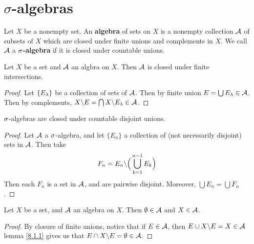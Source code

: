 \section{$\sigma$-algebras}

\begin{definition}
    Let $X$ be a nonempty set. An  \textbf{algebra} of sets on $X$ is a nonempty
    collection  $\mathcal{A}$ of subsets of $X$ which are closed under finite unions and
    complements in $X$. We call  $\mathcal{A}$ a \textbf{$\sigma$-algebra} if it is closed
    under countable unions.
\end{definition}

\begin{lemma}\label{8.1.1}
    Let $X$ be a set and $\mathcal{A}$ an algbra on $X$. Then $\mathcal{A}$ is closed under
    finite intersections.
\end{lemma}
\begin{proof}
    Let $\{E_\lambda\}$ be a collection of sets of $\mathcal{A}$. Then by finite union
    $E=\bigcup{E_\lambda} \in \mathcal{A}$. Then by complements,
    $X \backslash E=\bigcap{X \backslash E_\lambda} \in \mathcal{A}$.
\end{proof}
\begin{corollary}
    $\sigma$-algebras are closed under countable disjoint unions.
\end{corollary}
\begin{proof}
    Let $\mathcal{A}$ a $\sigma$-algebra, and let  $\{E_n\}$ a collection of (not
    necessarily disjoint) sets in $\mathcal{A}$. Then take
    \begin{equation}
        F_n=E_n \backslash \Big{(} \bigcup_{k=1}^{n-1}{E_k} \Big{)}
    \end{equation}
    Then each $F_n$ is a set in $\mathcal{A}$, and are pairwise disjoint. Moreover,
    $\bigcup{E_n}=\bigcup{F_n}$.
\end{proof}

\begin{lemma}\label{8.1.2}
    Let $X$ be a set, and $\mathcal{A}$ an algebra on $X$. Then $\emptyset \in \mathcal{A}$ and
    $X \in \mathcal{A}$.
\end{lemma}
\begin{proof}
    By closure of finite unions, notice that if $E \in \mathcal{A}$, then
    $E \cup X \backslash E = X \in \mathcal{A}$ lemma \ref{8.1.1} gives us that $E \cap
    X \backslash E=\emptyset \in \mathcal{A}$.
\end{proof}

